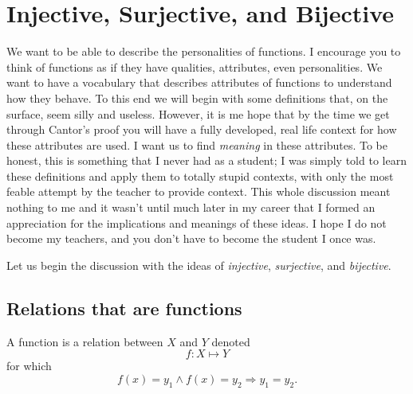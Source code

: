 \section{Injective, Surjective, and Bijective}
We want to be able to describe the personalities of functions.  I encourage you to think of functions as if they have qualities, attributes, even personalities.  We want to have a vocabulary that describes attributes of functions to understand how they behave.  To this end we will begin with some definitions that, on the surface, seem silly and useless.  However, it is me hope that by the time we get through Cantor's proof you will have a fully developed, real life context for how these attributes are used.  I want us to find \emph{meaning} in these attributes. To be honest, this is something that I never had as a student; I was simply told to learn these definitions and apply them to totally stupid contexts, with only the most feable attempt by the teacher to provide context.  This whole discussion meant nothing to me and it wasn't until much later in my career that I formed an appreciation for the implications and meanings of these ideas.  I hope I do not become my teachers, and you don't have to become the student I once was.

Let us begin the discussion with the ideas of \emph{injective}, \emph{surjective}, and \emph{bijective}.

\subsection*{Relations that are functions}
\begin{definition}[Function] A function is a relation between $X$ and $Y$ denoted $$f: X\mapsto Y$$ for which  $$ f(x) = y_1 \land f(x) = y_2 \Rightarrow y_1=y_2.$$
\end{definition}


